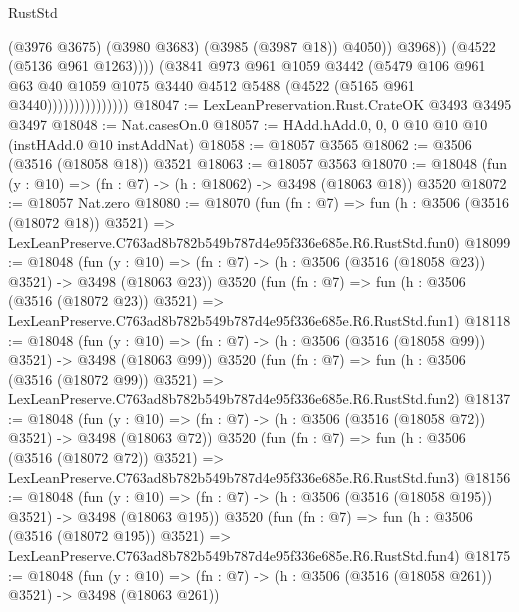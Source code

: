 \begin{lexlean}{RustStd}
\begin{coremodule}
                                      (@3976 @3675)
                                      (@3980 @3683)
                                      (@3985 (@3987 @18))
                                      @4050))
                                  @3968))
                              (@4522 (@5136 @961 @1263))))
                          (@3841
                            @973
                            @961
                            @1059
                            @3442
                            (@5479
                              @106
                              @961
                              @63
                              @40
                              @1059
                              @1075
                              @3440
                              @4512
                              @5488
                              (@4522 (@5165 @961 @3440)))))))))))))))
@18047 := LexLeanPreservation.Rust.CrateOK @3493 @3495 @3497
@18048 := Nat.casesOn.{0}
@18057 := HAdd.hAdd.{0, 0, 0} @10 @10 @10 (instHAdd.{0} @10 instAddNat)
@18058 := @18057 @3565
@18062 := @3506 (@3516 (@18058 @18)) @3521
@18063 := @18057 @3563
@18070 := @18048 (fun (y : @10) => (fn : @7) -> (h : @18062) -> @3498 (@18063 @18)) @3520
@18072 := @18057 Nat.zero
@18080 := @18070
    (fun (fn : @7) =>
    fun (h : @3506 (@3516 (@18072 @18)) @3521) =>
    LexLeanPreserve.C763ad8b782b549b787d4e95f336e685e.R6.RustStd.fun0)
@18099 := @18048
    (fun (y : @10) => (fn : @7) -> (h : @3506 (@3516 (@18058 @23)) @3521) -> @3498 (@18063 @23))
    @3520
    (fun (fn : @7) =>
    fun (h : @3506 (@3516 (@18072 @23)) @3521) =>
    LexLeanPreserve.C763ad8b782b549b787d4e95f336e685e.R6.RustStd.fun1)
@18118 := @18048
    (fun (y : @10) => (fn : @7) -> (h : @3506 (@3516 (@18058 @99)) @3521) -> @3498 (@18063 @99))
    @3520
    (fun (fn : @7) =>
    fun (h : @3506 (@3516 (@18072 @99)) @3521) =>
    LexLeanPreserve.C763ad8b782b549b787d4e95f336e685e.R6.RustStd.fun2)
@18137 := @18048
    (fun (y : @10) => (fn : @7) -> (h : @3506 (@3516 (@18058 @72)) @3521) -> @3498 (@18063 @72))
    @3520
    (fun (fn : @7) =>
    fun (h : @3506 (@3516 (@18072 @72)) @3521) =>
    LexLeanPreserve.C763ad8b782b549b787d4e95f336e685e.R6.RustStd.fun3)
@18156 := @18048
    (fun (y : @10) => (fn : @7) -> (h : @3506 (@3516 (@18058 @195)) @3521) -> @3498 (@18063 @195))
    @3520
    (fun (fn : @7) =>
    fun (h : @3506 (@3516 (@18072 @195)) @3521) =>
    LexLeanPreserve.C763ad8b782b549b787d4e95f336e685e.R6.RustStd.fun4)
@18175 := @18048
    (fun (y : @10) => (fn : @7) -> (h : @3506 (@3516 (@18058 @261)) @3521) -> @3498 (@18063 @261))

\end{coremodule}
\end{lexlean}
